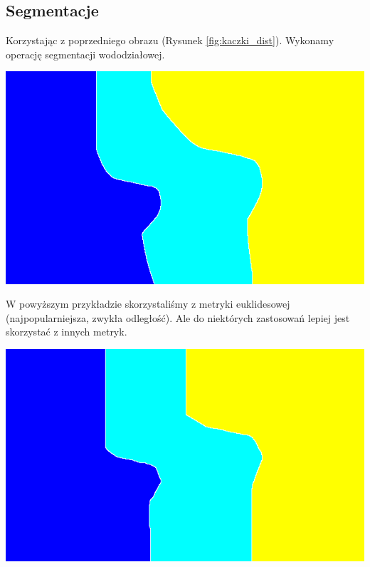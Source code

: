 \documentclass{article}
\begin{document}
	\subsection{Segmentacje}
	Korzystając z poprzedniego obrazu (Rysunek \ref{fig:kaczki_dist}). Wykonamy operację segmentacji wododziałowej.
	\begin{center}
		\includegraphics[width=\linewidth]{../../lab05/kaczki_watershed.png}
	\end{center}	
	W powyższym przykładzie skorzystaliśmy z metryki euklidesowej (najpopularniejsza, zwykła odległość). Ale do niektórych zastosowań lepiej jest skorzystać z innych metryk.
	
	\begin{center}
		\includegraphics[width=\linewidth]{../../lab05/kaczki_manhattan.png}
	\end{center}
\end{document}
